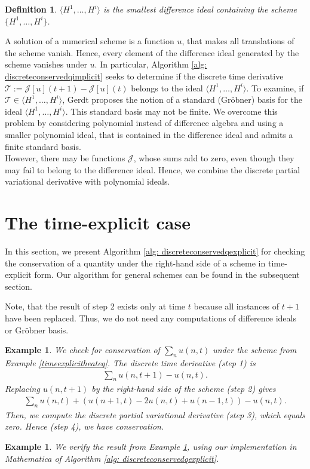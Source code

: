 \documentclass[sigconf,twocolumn]{acmart}
\newcommand{\1}{{\chi}}
\numberwithin{equation}{section}
\theoremstyle{thmlemcorr}
\numberwithin{theorem}{section}
\theoremstyle{thmlemcorr*}
\theoremstyle{defi}
\newtheorem{definition}[theorem]{Definition}
\theoremstyle{remexample}
\newtheorem{example}[theorem]{Example}
\theoremstyle{ass}
\begin{document}
\begin{definition}
	$\langle H^1,\ldots,H^i\rangle$ is the smallest difference ideal containing the scheme $\{H^1,\ldots,H^i\}$.
\end{definition}
A solution of a numerical scheme is a function $u$, that makes all translations of the scheme vanish. Hence, every element of the difference ideal generated by the scheme vanishes under $u$.
In particular, Algorithm \ref{alg: discreteconservedqimplicit} seeks to determine if the discrete time derivative $\mathcal{T}:=\mathcal{J}[u](t+1)-\mathcal{J}[u](t)$ belongs to the ideal $\langle H^1,\ldots,H^i\rangle$. To examine, if $\mathcal{T}\in\langle H^1,\ldots,H^i\rangle$, Gerdt proposes the notion of a standard (Gr{\"o}bner) basis for the ideal $\langle H^1,\ldots,H^i\rangle$. This standard basis may not be finite. We overcome this problem by considering polynomial instead of difference algebra and using a smaller polynomial ideal, that is contained in the difference ideal and admits a finite standard basis.\\
However, there may be functions $\mathcal{J}$, whose sums add to zero, even though they may fail to belong to the difference ideal. Hence, we combine the discrete partial variational derivative with polynomial ideals.
\section{The time-explicit case}
\label{time-exp}
In this section, we present Algorithm \ref{alg: discreteconservedqexplicit}  for checking the conservation of a quantity under the right-hand side of a scheme in time-explicit form. Our algorithm for general schemes can be found in the subsequent section.

Note, that the result of step 2 exists only at time $t$ because all instances of $t+1$ have been replaced. Thus, we do not need any computations of difference ideals or Gr{\"o}bner basis.
\begin{example}
	\label{timeexplicitheateqalgo}
	We check for conservation of $\sum_nu(n,t)$ under the scheme from Example \ref{timeexplicitheateq}.
	The discrete time derivative (step 1) is
	\begin{gather*}
		\sum_nu(n,t+1)-u(n,t).
	\end{gather*}
	Replacing $u(n,t+1)$ by the right-hand side of the scheme (step 2) gives
	\begin{gather*}
		\sum_nu(n,t)+(u(n+1,t)-2u(n,t)+u(n-1,t))-u(n,t).
	\end{gather*}
	Then, we compute the discrete partial variational derivative (step 3), which equals zero. Hence (step 4), we have conservation.
\end{example}
\begin{example}
	\label{heatex1}
	We verify the result from Example \ref{timeexplicitheateqalgo}, using our implementation in {\sc Mathematica} of Algorithm \ref{alg: discreteconservedqexplicit}.
	
	\begin{small}
		
		
	\end{small}
\end{example}
\end{document}
